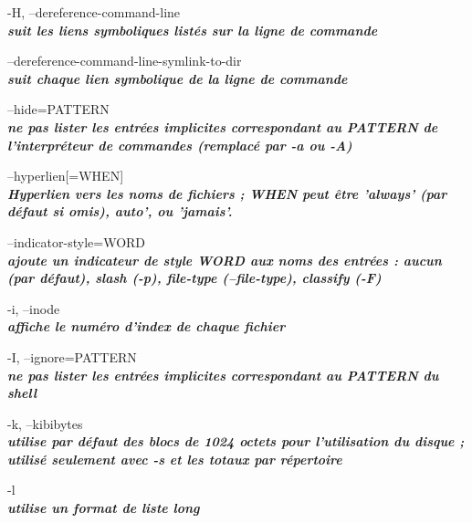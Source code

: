 \documentclass{article}
\begin{document}
        \par-H, --dereference-command-line\\
              \textit{\textbf{suit les liens symboliques listés sur la ligne de commande}}\\

      \par --dereference-command-line-symlink-to-dir\\
              \textit{\textbf{suit chaque lien symbolique de la ligne de commande}}\\

              
       \par--hide=PATTERN\\
              \textit{\textbf{ne pas lister les entrées implicites correspondant au PATTERN de l'interpréteur de commandes (remplacé
              par -a ou -A)}}\\
\par--hyperlien[=WHEN]\\
              \textit{\textbf{Hyperlien vers les noms de fichiers ; WHEN peut être 'always' (par défaut si omis),
              auto', ou 'jamais'.}}\\

       \par--indicator-style=WORD\\
               \textit{\textbf{ajoute un indicateur de style WORD aux noms des entrées : aucun (par défaut),
              slash (-p), file-type (--file-type), classify (-F)}}\\
   
       \par -i, --inode\\
              \textit{\textbf{ affiche le numéro d'index de chaque fichier}}\\

        \par-I, --ignore=PATTERN\\
               \textit{\textbf{ne pas lister les entrées implicites correspondant au PATTERN du shell}}\\

       \par-k, --kibibytes\\
              \textit{\textbf{ utilise par défaut des blocs de 1024 octets pour l'utilisation du disque ; utilisé seulement avec -s
              et les totaux par répertoire}}\\

      \par -l \\   \textit{\textbf{ utilise un format de liste long}}\\
\end{document}
